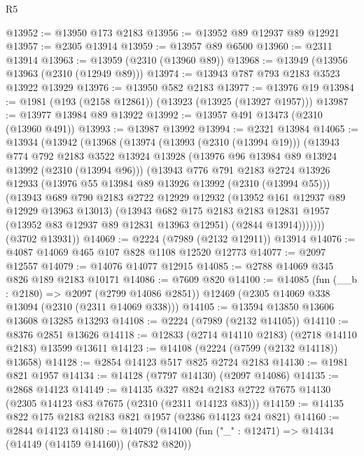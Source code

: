 \begin{lexlean}{R5}
\begin{coremodule}
@13952 := @13950 @173 @2183
@13956 := @13952 @89 @12937 @89 @12921
@13957 := @2305 @13914
@13959 := @13957 @89 @6500
@13960 := @2311 @13914
@13963 := @13959 (@2310 (@13960 @89))
@13968 := @13949 (@13956 @13963 (@2310 (@12949 @89)))
@13974 := @13943 @787 @793 @2183 @3523 @13922 @13929
@13976 := @13950 @582 @2183
@13977 := @13976 @19
@13984 := @1981 (@193 (@2158 @12861)) (@13923 (@13925 (@13927 @1957)))
@13987 := @13977 @13984 @89 @13922
@13992 := @13957 @491 @13473 (@2310 (@13960 @491))
@13993 := @13987 @13992
@13994 := @2321 @13984
@14065 := @13934
    (@13942
      (@13968
        (@13974
          (@13993 (@2310 (@13994 @19)))
          (@13943
            @774
            @792
            @2183
            @3522
            @13924
            @13928
            (@13976 @96 @13984 @89 @13924 @13992 (@2310 (@13994 @96)))
            (@13943
              @776
              @791
              @2183
              @2724
              @13926
              @12933
              (@13976 @55 @13984 @89 @13926 @13992 (@2310 (@13994 @55)))
              (@13943
                @689
                @790
                @2183
                @2722
                @12929
                @12932
                (@13952 @161 @12937 @89 @12929 @13963 @13013)
                (@13943
                  @682
                  @175
                  @2183
                  @2183
                  @12831
                  @1957
                  (@13952 @83 @12937 @89 @12831 @13963 @12951)
                  (@2844 @13914)))))))
      (@3702 @13931))
@14069 := @2224 (@7989 (@2132 @12911)) @13914
@14076 := @4087 @14069 @465 @107 @828 @1108 @12520 @12773
@14077 := @2097 @12557
@14079 := @14076 @14077 @12915
@14085 := @2788 @14069 @345 @826 @189 @2183 @10171
@14086 := @7609 @820
@14100 := @14085
    (fun (__b : @2180) => @2097 (@2799 @14086 @2851))
    @12469
    (@2305 @14069 @338 @13094 (@2310 (@2311 @14069 @338)))
@14105 := @13594 @13850 @13606 @13608 @13285 @13293
@14108 := @2224 (@7989 (@2132 @14105))
@14110 := @8376 @2851 @13626
@14118 := @12833 (@2714 @14110 @2183) (@2718 @14110 @2183) @13599 @13611
@14123 := @14108 (@2224 (@7599 (@2132 @14118)) @13658)
@14128 := @2854 @14123 @517 @825 @2724 @2183
@14130 := @1981 @821 @1957
@14134 := @14128 (@7797 @14130) (@2097 @14086)
@14135 := @2868 @14123
@14149 := @14135
    @327
    @824
    @2183
    @2722
    @7675
    @14130
    (@2305 @14123 @83 @7675 (@2310 (@2311 @14123 @83)))
@14159 := @14135 @822 @175 @2183 @2183 @821 @1957 (@2386 @14123 @24 @821)
@14160 := @2844 @14123
@14180 := @14079
    (@14100
      (fun ("_" : @12471) => @14134 (@14149 (@14159 @14160)) (@7832 @820))

\end{coremodule}
\end{lexlean}
